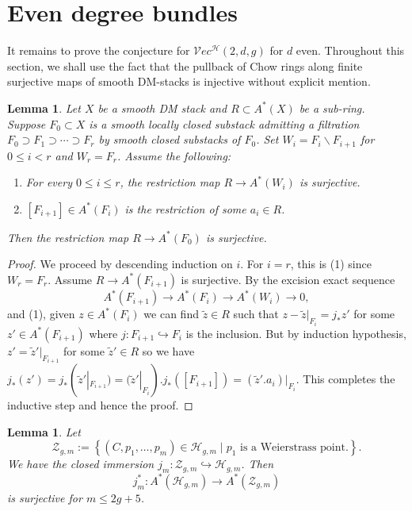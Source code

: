 \documentclass[11pt]{amsart}
\newtheorem{lemma}[theorem]{Lemma}
\theoremstyle{definition}
\newcommand{\h}{\mathcal{H}}
\newcommand{\ve}{\mathcal{V}ec}
\begin{document}
\section{Even degree bundles}\label{sec:even-deg}
It remains to prove the conjecture for $\ve^\h(2,d,g)$ for $d$ even. 
Throughout this section, we shall use the fact that the pullback of Chow rings along finite surjective maps of smooth DM-stacks is injective without explicit mention.
\begin{lemma} \label{stratification generation}
    Let $X$ be a smooth DM stack and $R\subset A^* (X)$ be a sub-ring. Suppose $F_0\subset X$ is a smooth locally closed substack admitting a filtration $F_0 \supset F_1\supset\cdots \supset F_r$ by smooth closed substacks of $F_0$. Set $W_i =F_i \backslash F_{i+1}$ for $0\leq i< r$ and $W_r=F_r$. Assume the following:\begin{enumerate}
        \item For every $0\leq i\leq r$, the restriction map $R\rightarrow A^* (W_i)$ is surjective.
        \item $[F_{i+1}]\in A^*(F_i)$ is the restriction of some $a_i \in R$. 
    \end{enumerate}
    Then the restriction map $R\rightarrow A^*(F_0)$ is surjective. 
\end{lemma}
\begin{proof}
    We proceed by descending induction on $i$. For $i=r$, this is (1) since $W_r=F_r$. Assume $R\rightarrow A^* (F_{i+1})$ is surjective. By the excision exact sequence $$ A^* (F_{i+1})\rightarrow A^* (F_i) \rightarrow A^* (W_i) \rightarrow 0,$$ and (1), given $z\in A^* (F_i)$ we can find $\tilde z\in R$ such that $z-\tilde z|_{F_i} = j_* z'$ for some $z'\in A^* (F_{i+1})$ where $j: F_{i+1} \hookrightarrow F_i$ is the inclusion. But by induction hypothesis, $z' =\tilde z'|_{F_{i+1}}$ for some $\tilde z' \in R$ so we have $j_* (z') =j_* (\tilde z'|_{F_{i+1}}) = (\tilde z'|_{F_i}). j_*([F_{i+1}]) = (\tilde z'. a_i)|_{F_i}$. This completes the inductive step and hence the proof. 
\end{proof}
\begin{lemma}\label{H surjects onto Z}
      Let \begin{equation*}
        \mathcal Z_{g,m}:= \left \{ (C,p_1,\dots, p_m)\in \mathcal H_{g,m}\mid p_1\text{ is a Weierstrass point.} \right \}.
    \end{equation*}
We have the closed immersion $j_m: \mathcal Z_{g,m} \hookrightarrow \mathcal H_{g,m}$. Then $$j_m^* :A ^* (\mathcal H_{g,m}) \rightarrow A^* (\mathcal Z_{g,m})$$ is surjective for $m\leq 2g+5$.
\end{lemma}
\end{document}
